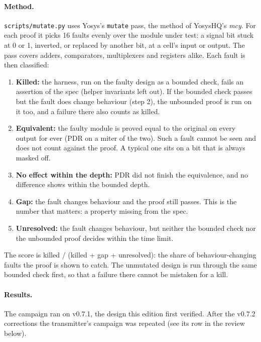 \documentclass[11pt,a4paper]{article}
\newcommand{\sig}[1]{\texttt{#1}}
\begin{document}
\paragraph{Method.} \sig{scripts/mutate.py} uses Yosys's \sig{mutate} pass, the method of YosysHQ's \emph{mcy}. For each proof it picks 16 faults evenly over the module under test: a signal bit stuck at 0 or 1, inverted, or replaced by another bit, at a cell's input or output. The pass covers adders, comparators, multiplexers and registers alike. Each fault is then classified:
\begin{enumerate}
\item \textbf{Killed:} the harness, run on the faulty design as a bounded check, fails an assertion of the spec (helper invariants left out). If the bounded check passes but the fault does change behaviour (step 2), the unbounded proof is run on it too, and a failure there also counts as killed.
\item \textbf{Equivalent:} the faulty module is proved equal to the original on every output for ever (PDR on a miter of the two). Such a fault cannot be seen and does not count against the proof. A typical one sits on a bit that is always masked off.
\item \textbf{No effect within the depth:} PDR did not finish the equivalence, and no difference shows within the bounded depth.
\item \textbf{Gap:} the fault changes behaviour and the proof still passes. This is the number that matters: a property missing from the spec.
\item \textbf{Unresolved:} the fault changes behaviour, but neither the bounded check nor the unbounded proof decides within the time limit.
\end{enumerate}
The score is killed / (killed + gap + unresolved): the share of behaviour-changing faults the proof is shown to catch. The unmutated design is run through the same bounded check first, so that a failure there cannot be mistaken for a kill.

\paragraph{Results.} The campaign ran on v0.7.1, the design this edition first verified. After the v0.7.2 corrections the transmitter's campaign was repeated (see its row in the review below).
\end{document}
